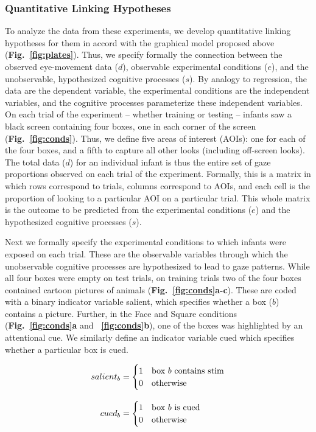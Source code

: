 \documentclass[12pt]{article}
\begin{document}
\subsubsection*{Quantitative Linking Hypotheses}

To analyze the data from these experiments, we develop quantitative linking hypotheses for them in accord with the graphical model proposed above (\textbf{Fig.~\ref{fig:plates}}). Thus, we specify formally the connection between the observed eye-movement data ($d$), observable experimental conditions ($e$), and the unobservable, hypothesized cognitive processes ($s$). By analogy to regression, the data are the dependent variable, the experimental conditions are the independent variables, and the cognitive processes parameterize these independent variables. On each trial of the experiment -- whether training or testing -- infants saw a black screen containing four boxes, one in each corner of the screen (\textbf{Fig.~\ref{fig:conds}}). Thus, we define five areas of interest (AOIs): one for each of the four boxes, and a fifth to capture all other looks (including off-screen looks). The total data ($d$) for an individual infant is thus the entire set of gaze proportions observed on each trial of the experiment. Formally, this is a matrix in which rows correspond to trials, columns correspond to AOIs, and each cell is the proportion of looking to a particular AOI on a particular trial. This whole matrix is the outcome to be predicted from the experimental conditions ($e$) and the hypothesized cognitive processes ($s$).

	Next we formally specify the experimental conditions to which infants were exposed on each trial. These are the observable variables through which the unobservable cognitive processes are hypothesized to lead to gaze patterns. While all four boxes were empty on test trials, on training trials two of the four boxes contained cartoon pictures of animals (\textbf{Fig.~\ref{fig:conds}a-c}). These are coded with a binary indicator variable salient, which specifies whether a box ($b$) contains a picture. Further, in the Face and Square conditions (\textbf{Fig.~\ref{fig:conds}a} and \textbf{~\ref{fig:conds}b}), one of the boxes was highlighted by an attentional cue. We similarly define an indicator variable cued which specifies whether a particular box is cued.

\begin{equation}\label{eq:inds}
\setlength{\jot}{12pt}
\begin{aligned} 
salient_{b} &= \begin{cases} 1 & \text{box $b$ contains stim}\\
	0 &\text{otherwise}
	\end{cases}\\
cued_{b} &=\begin{cases} 1 & \text{box $b$ is cued}\\
	0 &\text{otherwise}
	\end{cases}\\
\end{aligned}
\end{equation}
\end{document}
